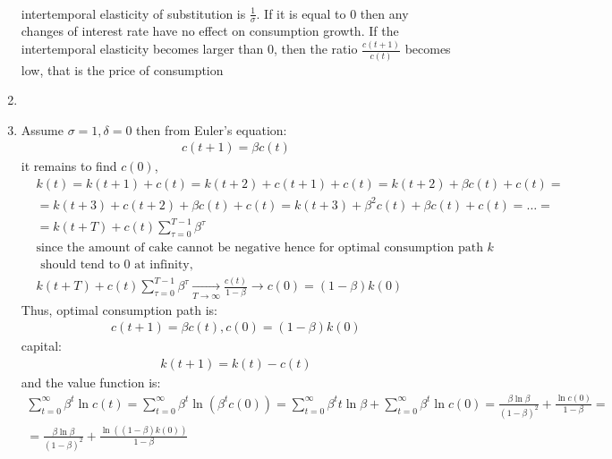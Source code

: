 \documentclass[a4paper]{article}
\begin{document}
\begin{enumerate}
\begin{align*}
\end{align*}
intertemporal elasticity of substitution is $\frac{1}{\sigma}$. If it is equal to 0 then any changes of interest rate have no effect on consumption growth. If the intertemporal elasticity becomes larger than 0, then the ratio $\frac{c(t+1)}{c(t)}$ becomes low, that is the price of consumption 
\item 
\item Assume $\sigma = 1, \delta = 0$ then
from Euler's equation:
\begin{align*}
c(t+1) = \beta c(t)
\end{align*}
it remains to find $c(0)$,
\begin{align*}
&k(t) = k(t+1) + c(t) = k(t+2) + c(t+1) + c(t) = k(t+2) + \beta c(t) + c(t) = \\
&=k(t+3) + c(t+2) + \beta c(t) + c(t) = k(t+3) + \beta^2 c(t) + \beta c(t) + c(t) = \dots =\\
&=k(t + T) + c(t) \sum_{\tau = 0}^{T-1} \beta^{\tau} \\
&\text{since the amount of cake cannot be negative hence for optimal consumption path } k\\
&\text{ should tend to 0 at infinity, }\\
&k(t + T) + c(t) \sum_{\tau = 0}^{T-1} \beta^{\tau} \underset{T \to \infty}{\to} \frac{c(t)}{1-\beta} \to c(0) = (1-\beta)k(0)
\end{align*}
Thus, optimal consumption path is:
\begin{align*}
c(t+1) = \beta c(t), c(0) = (1-\beta)k(0)
\end{align*}
capital:
\begin{align*}
k(t+1) = k(t) - c(t)
\end{align*}
and the value function is:
\begin{align*}
\sum_{t=0}^{\infty} \beta^t \ln c(t) = \sum_{t=0}^{\infty} \beta^{t} \ln (\beta^t c(0)) = \sum_{t=0}^{\infty} \beta^t t \ln \beta + \sum_{t=0}^{\infty} \beta^t \ln c(0) = \frac{\beta \ln \beta}{(1-\beta)^2} + \frac{\ln c(0)}{1 - \beta } = \\
=\frac{\beta \ln \beta}{(1-\beta)^2} + \frac{\ln((1-\beta)k(0))}{1-\beta}
\end{align*}
\end{enumerate}
\end{document}
